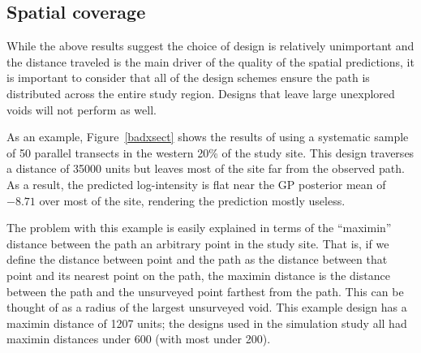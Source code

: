 \documentclass[review]{elsarticle}
\begin{document}
\subsection{Spatial coverage}

While the above results suggest the choice of design is relatively unimportant
and the distance traveled is the main driver of the quality of the spatial
predictions, it is important to consider that all of the design schemes ensure
the path is distributed across the entire study region. Designs that leave
large unexplored voids will not perform as well.

As an example, Figure~\ref{badxsect} shows the results of using a systematic
sample of 50 parallel transects in the western 20\% of the study site. This
design traverses a distance of 35000 units but leaves most of the site far from
the observed path. As a result, the predicted log-intensity is flat near the
GP posterior mean of \(-8.71\) over most of the site, rendering the prediction
mostly useless.

The problem with this example is easily explained in terms of the ``maximin''
distance between the path an arbitrary point in the study site. That is, if we
define the distance between point and the path as the distance between that
point and its nearest point on the path, the maximin distance is the distance
between the path and the unsurveyed point farthest from the path. This can be
thought of as a radius of the largest unsurveyed void. This example design has
a maximin distance of 1207 units; the designs used in the simulation study all
had maximin distances under 600 (with most under 200).
\end{document}
